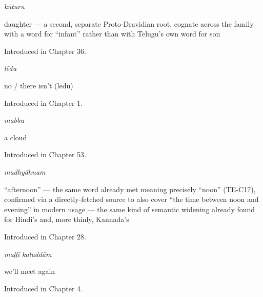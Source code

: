 \noindent\begin{minipage}[t]{\linewidth}
\raggedright
\textbf{}\enspace\emph{kūturu}\par
\small daughter — a second, separate Proto-Dravidian root, cognate across the family with a word for \textquotedblleft{}infant\textquotedblright{} rather than with Telugu's own word for son\par
\footnotesize Introduced in Chapter 36.
\end{minipage}\par\medskip

\noindent\begin{minipage}[t]{\linewidth}
\raggedright
\textbf{}\enspace\emph{lēdu}\par
\small no / there isn't (lēdu)\par
\footnotesize Introduced in Chapter 1.
\end{minipage}\par\medskip

\noindent\begin{minipage}[t]{\linewidth}
\raggedright
\textbf{}\enspace\emph{mabbu}\par
\small a cloud\par
\footnotesize Introduced in Chapter 53.
\end{minipage}\par\medskip

\noindent\begin{minipage}[t]{\linewidth}
\raggedright
\textbf{}\enspace\emph{madhyāhnam}\par
\small \textquotedblleft{}afternoon\textquotedblright{} — the same word already met meaning precisely \textquotedblleft{}noon\textquotedblright{} (TE-C17), confirmed via a directly-fetched source to also cover \textquotedblleft{}the time between noon and evening\textquotedblright{} in modern usage — the same kind of semantic widening already found for Hindi's  and, more thinly, Kannada's \par
\footnotesize Introduced in Chapter 28.
\end{minipage}\par\medskip

\noindent\begin{minipage}[t]{\linewidth}
\raggedright
\textbf{ }\enspace\emph{maḷḷī kaluddām}\par
\small we'll meet again\par
\footnotesize Introduced in Chapter 4.
\end{minipage}\par\medskip

